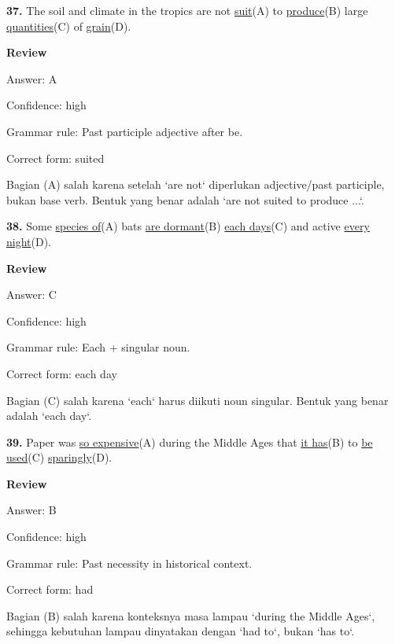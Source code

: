 \documentclass[12pt]{article}
\begin{document}
\vspace{\questionblockgap}
\noindent\textbf{37.} The soil and climate in the tropics are not \uline{suit}(A) to \uline{produce}(B) large \uline{quantities}(C) of \uline{grain}(D).
\par
\begingroup
\setlength{\parskip}{0pt}
\setlength{\parindent}{0pt}
\textbf{Review}\par
Answer: A\par
Confidence: high\par
Grammar rule: Past participle adjective after be.\par
Correct form: suited\par
Bagian (A) salah karena setelah `are not` diperlukan adjective/past participle, bukan base verb. Bentuk yang benar adalah `are not suited to produce ...`.\par
\endgroup
\par
\vspace{\questionblockgap}
\noindent\textbf{38.} Some \uline{species of}(A) bats \uline{are dormant}(B) \uline{each days}(C) and active \uline{every night}(D).
\par
\begingroup
\setlength{\parskip}{0pt}
\setlength{\parindent}{0pt}
\textbf{Review}\par
Answer: C\par
Confidence: high\par
Grammar rule: Each + singular noun.\par
Correct form: each day\par
Bagian (C) salah karena `each` harus diikuti noun singular. Bentuk yang benar adalah `each day`.\par
\endgroup
\par
\vspace{\questionblockgap}
\noindent\textbf{39.} Paper was \uline{so expensive}(A) during the Middle Ages that \uline{it has}(B) to \uline{be used}(C) \uline{sparingly}(D).
\par
\begingroup
\setlength{\parskip}{0pt}
\setlength{\parindent}{0pt}
\textbf{Review}\par
Answer: B\par
Confidence: high\par
Grammar rule: Past necessity in historical context.\par
Correct form: had\par
Bagian (B) salah karena konteksnya masa lampau `during the Middle Ages`, sehingga kebutuhan lampau dinyatakan dengan `had to`, bukan `has to`.\par
\endgroup
\end{document}
